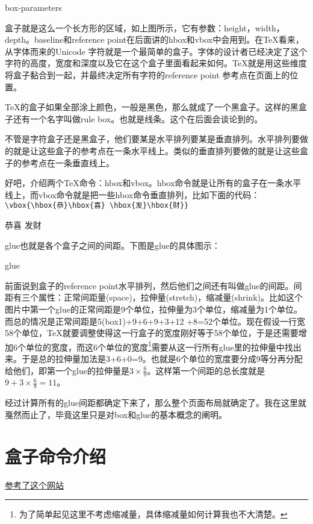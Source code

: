 \documentclass[11pt,oneside]{book}
\begin{document}
        \begin{linefig}[0.8]{box-parameters}
          \label{fig:box参数}
        \end{linefig}

        盒子就是这么一个长方形的区域，如上图所示，它有参数：height，width，depth。baseline和reference point在后面讲的hbox和vbox中会用到。在\TeX 看来，从字体而来的Unicode 字符就是一个最简单的盒子。字体的设计者已经决定了这个字符的高度，宽度和深度以及它在这个盒子里面看起来如何。\TeX 就是用这些维度将盒子黏合到一起，并最终决定所有字符的reference point 参考点在页面上的位置。

        \TeX 的盒子如果全部涂上颜色，一般是黑色，那么就成了一个黑盒子。这样的黑盒子还有一个名字叫做rule box。也就是线条。这个在后面会谈论到的。

        不管是字符盒子还是黑盒子，他们要某是水平排列要某是垂直排列。水平排列要做的就是让这些盒子的参考点在一条水平线上。类似的垂直排列要做的就是让这些盒子的参考点在一条垂直线上。

        好吧，介绍两个\TeX 命令：hbox和vbox。hbox命令就是让所有的盒子在一条水平线上，而vbox命令就是把一些hbox命令垂直排列，比如下面的代码：\\
        \verb+\vbox{\hbox{恭}\hbox{喜} \hbox{发}\hbox{财}}+

        \vbox{\hbox{恭}\hbox{喜} \hbox{发}\hbox{财}}

        glue也就是各个盒子之间的间距。下图是glue的具体图示：
        \begin{linefig}{glue}
          \label{fig:glue说明}
        \end{linefig}
        前面说到盒子的reference point水平排列，然后他们之间还有叫做glue的间距。间距有三个属性：正常间距量(space)，拉伸量(stretch)，缩减量(shrink)。比如这个图片中第一个glue的正常间距是9个单位，拉伸量为3个单位，缩减量为1个单位。而总的情况是正常间距是5(box1)+9+6+9+3+12\- +8=52个单位。现在假设一行宽58个单位，\TeX 就要调整使得这一行盒子的宽度刚好等于58个单位，于是还需要增加6个单位的宽度，而这6个单位的宽度\footnote{为了简单起见这里不考虑缩减量，具体缩减量如何计算我也不大清楚。}需要从这一行所有glue里的拉伸量中找出来。于是总的拉伸量加法是3+6+0=9。也就是6个单位的宽度要分成9等分再分配给他们，即第一个glue的拉伸量是$3\times\frac { 6 }{ 9 } $。这样第一个间距的总长度就是$9+3\times\frac { 6 }{ 9 } =11$。

        经过计算所有的glue间距都确定下来了，那么整个页面布局就确定了。我在这里就戛然而止了，毕竟这里只是对box和glue的基本概念的阐明。


        \section{盒子命令介绍}
        \href{http://tex.stackexchange.com/questions/83930/what-are-the-different-kinds-of-boxes-in-latex}{参考了这个网站}
\end{document}
